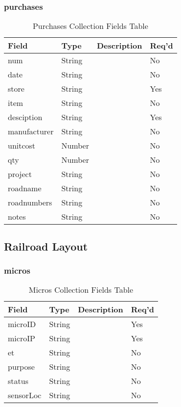 \subsubsection{purchases}
\begin{table}[H]
    \begin{tabular}{|L{3cm}|L{1.7cm}|L{8.8cm}|L{1.3cm}|}
    \hline
        \textbf{Field} & \textbf{Type} & \textbf{Description} & \textbf{Req'd} \\ \hline
	num & String &  & No \\ \hline
	date & String &  & No \\ \hline
	store & String &  & Yes \\ \hline
	item & String &  & No \\ \hline
	desciption & String &  & Yes \\ \hline
	manufacturer & String &  & No \\ \hline
	unitcost & Number &  & No \\ \hline
	qty & Number &  & No \\ \hline
	project & String &  & No \\ \hline
	roadname & String &  & No \\ \hline
	roadnumbers & String &  & No \\ \hline
	notes & String &  & No \\ \hline
    \end{tabular}
    \caption{\label{purchase-table}Purchases Collection Fields Table}
    \end{table}
\subsection{Railroad Layout}
\subsubsection{micros}
\begin{table}[H]
    \begin{tabular}{|L{3cm}|L{1.7cm}|L{8.8cm}|L{1.3cm}|}
    \hline
        \textbf{Field} & \textbf{Type} & \textbf{Description} & \textbf{Req'd} \\ \hline
	microID & String &  & Yes \\ \hline
	microIP & String &  & Yes \\ \hline
	et & String &  & No \\ \hline
	purpose & String &  & No \\ \hline
	status & String &  & No \\ \hline
	sensorLoc & String &  & No \\ \hline
    \end{tabular}
    \caption{\label{micro-table}Micros Collection Fields Table}
    \end{table}

